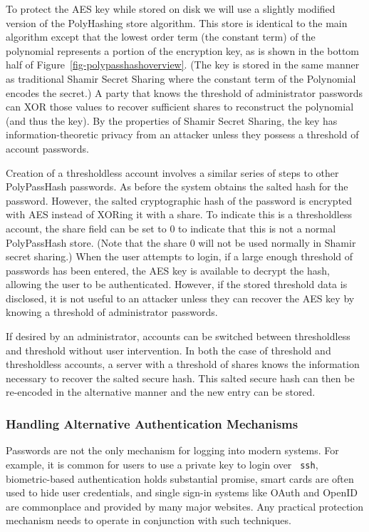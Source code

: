 To protect the AES key while stored on disk we will use a slightly modified
version of the PolyHashing store algorithm.   This store is identical to 
the main algorithm except
that the lowest order term (the constant term) of the polynomial represents 
a portion of the encryption key, as is shown in the bottom half of 
Figure~\ref{fig-polypasshashoverview}.   (The key is stored in the same manner
as traditional Shamir Secret Sharing
where the constant term of the Polynomial encodes the secret.)
A party that knows the threshold of administrator passwords can XOR those
values to recover sufficient shares to reconstruct the polynomial (and thus
the key).  
By the properties of Shamir Secret Sharing, the key has information-theoretic 
privacy from an attacker unless they possess a threshold of account passwords.



Creation of a thresholdless account involves a similar series of steps to
other PolyPassHash passwords.   As before the system obtains the 
salted hash for the password.   However, the salted cryptographic hash of 
the password is encrypted with AES instead of XORing it with a share.
To indicate this is a thresholdless account, the share field can 
be set to 0 to indicate that this is not a normal PolyPassHash 
store.   (Note that the share 0 will not be used normally in Shamir secret
sharing.)   When the user attempts to login, if a large enough 
threshold of passwords has been entered, the AES key is available to decrypt 
the hash, allowing the user to  be authenticated.   However,
if the stored threshold data is disclosed, it is not useful to an attacker
unless they can recover the AES key by knowing a threshold of
administrator passwords.


If desired by an administrator, accounts can be switched between thresholdless
and threshold without user intervention.
In both the case of threshold and thresholdless accounts, a server with
a threshold of shares knows the information necessary to recover the salted 
secure hash.   This salted secure hash can then be re-encoded in the 
alternative manner and the new entry can be stored.

\subsubsection{Handling Alternative Authentication Mechanisms}

Passwords are not the only mechanism for logging into modern systems.   For
example, it is common for users to use a private key to login over {\tt
ssh}, biometric-based authentication holds substantial promise, 
smart cards are often used to hide user credentials, and single
sign-in systems like OAuth and OpenID are commonplace and provided by 
many major websites.   Any practical protection mechanism needs to operate
in conjunction with such techniques.

